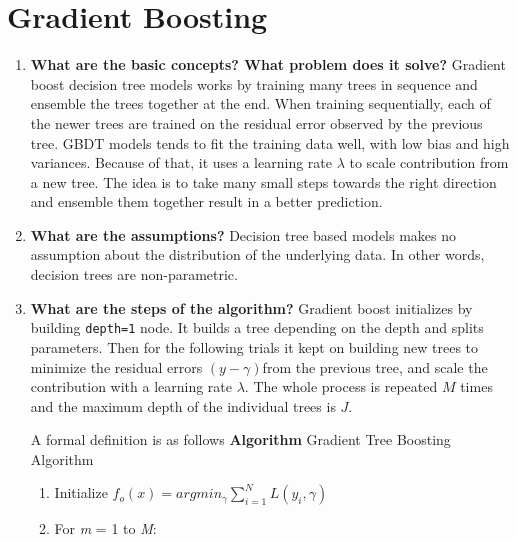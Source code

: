\documentclass{article}
\begin{document}
\bigbreak\bigbreak\bigbreak\bigbreak\bigbreak\bigbreak\bigbreak\bigbreak\bigbreak\bigbreak
\section{Gradient Boosting}
\noindent
\begin{enumerate}
    \item \textbf{What are the basic concepts? What problem does it solve?}
    \noindent 
    \smallbreak
    Gradient boost decision tree models works by training many trees in sequence and ensemble the trees together at the end. When training sequentially, each of the newer trees are trained on the residual error observed by the previous tree. GBDT models tends to fit the training data well, with low bias and high variances. Because of that, it uses a learning rate $\lambda$ to scale contribution from a new tree. The idea is to take many small steps towards the right direction and ensemble them together result in a better prediction.

    \item \textbf{What are the assumptions?}
    \noindent 
    \smallbreak
    Decision tree based models makes no assumption about the distribution of the underlying data. In other words, decision trees are non-parametric.
    
    \item \textbf{What are the steps of the algorithm?}
    \noindent 
    \smallbreak
    Gradient boost initializes by building \verb|depth=1| node. It builds a tree depending on the depth and splits parameters. Then for the following trials it kept on building new trees to minimize the residual errors $(y - \gamma)$from the previous tree, and scale the contribution with a learning rate $\lambda$. The whole process is repeated $M$ times and the maximum depth of the individual trees is $J$.
    
    A formal definition is as follows \cite{1}
    \bigbreak
    \noindent
    \hline
    \textbf{Algorithm} Gradient Tree Boosting Algorithm
    \hline
    \begin{enumerate}
        \item Initialize $f_o(x) = argmin_{\gamma} \sum_{i=1}^{N} L(y_i, \gamma)$
        \item For \emph{m} = 1 to \emph{M}:
            \begin{enumerate}
                

\end{enumerate}
\end{enumerate}
\end{enumerate}
\end{document}
